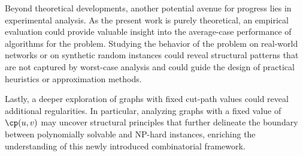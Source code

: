 Beyond theoretical developments, another potential avenue for progress lies in experimental analysis.
As the present work is purely theoretical, an empirical evaluation could provide valuable insight into the average-case performance of algorithms for the \MinCutPath{} problem.
Studying the behavior of the problem on real-world networks or on synthetic random instances could reveal structural patterns that are not captured by worst-case analysis and could guide the design of practical heuristics or approximation methods.

Lastly, a deeper exploration of graphs with fixed cut-path values could reveal additional regularities.
In particular, analyzing graphs with a fixed value of $\cp(u,v)$ may uncover structural principles that further delineate the boundary between polynomially solvable and NP-hard instances, enriching the understanding of this newly introduced combinatorial framework.

